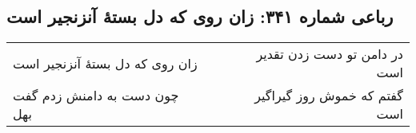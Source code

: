 \begin{center}
\section*{رباعی شماره ۳۴۱: زان روی که دل بستهٔ آنزنجیر است}
\label{sec:0341}
\begin{longtable}{l p{0.5cm} r}
زان روی که دل بستهٔ آنزنجیر است
&&
در دامن تو دست زدن تقدیر است
\\
چون دست به دامنش زدم گفت بهل
&&
گفتم که خموش روز گیراگیر است
\\
\end{longtable}
\end{center}
